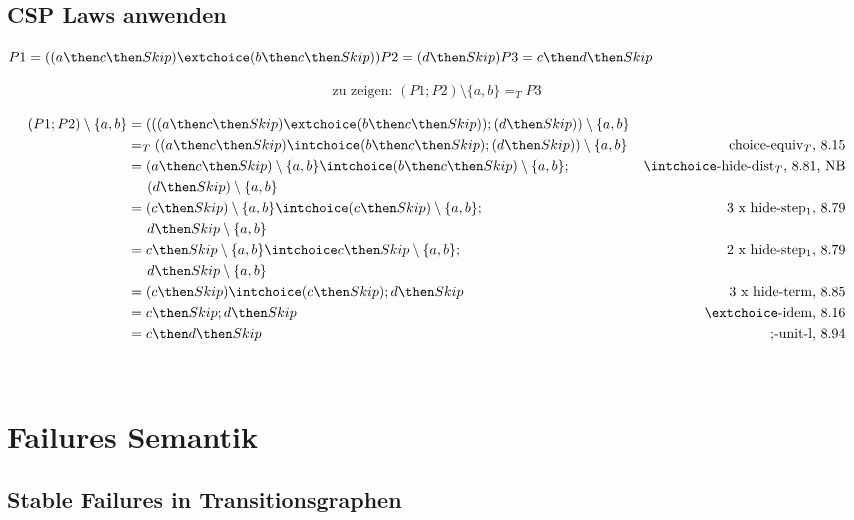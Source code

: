 \documentclass{scrreprt}
\begin{document}
\section{CSP Laws anwenden}

$
P1 = ((a \then c \then Skip) \extchoice (b \then c \then Skip))\\
P2 = (d \then Skip)\\
P3 = c \then d \then Skip
$

\begin{align*}
  \text{zu zeigen: } (P1; P2) \setminus \{a,b\} =_T P3
\end{align*}

\begin{align*}
  (P1; P2) \setminus \{a,b\} &= (((a \then c \then Skip) \extchoice (b \then c \then Skip)); (d \then Skip)) \setminus \{a,b\}& \\
         &=_T ((a \then c \then Skip) \intchoice (b \then c \then Skip); (d \then Skip)) \setminus \{a,b\} &\text{choice-equiv$_T$, 8.15}\\
         &= (a \then c \then Skip) \setminus \{a,b\} \intchoice (b \then c \then Skip) \setminus \{a,b\}; &\intchoice\text{-hide-dist$_T$, 8.81, NB}\\
         &\hspace{0.5cm}(d \then Skip) \setminus \{a,b\}\\
         &=(c \then Skip) \setminus \{a,b\} \intchoice (c \then Skip) \setminus \{a,b\}; &\text{3 x hide-step$_1$, 8.79}\\
         &\hspace{0.5cm} d \then Skip \setminus \{a,b\}\\
         &=c \then Skip \setminus \{a,b\} \intchoice c \then Skip \setminus \{a,b\}; &\text{2 x hide-step$_1$, 8.79}\\
         &\hspace{0.5cm} d \then Skip \setminus \{a,b\}\\
         &= (c \then Skip) \intchoice (c \then Skip); d \then Skip &\text{3 x hide-term, 8.85}\\
         &= c \then Skip; d \then Skip & \extchoice\text{-idem, 8.16}\\
         &= c \then d \then Skip & \text{;-unit-l, 8.94}
\end{align*}

\flushright{\qedsymbol}\\

\chapter{Failures Semantik}

\section{Stable Failures in Transitionsgraphen}
\end{document}
